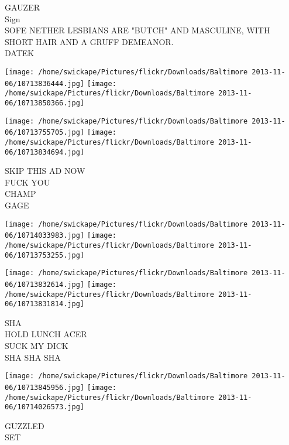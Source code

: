 \documentclass[10pt,letterpaper]{article}
\begin{document}
GAUZER\\
Sign\\
SOFE NETHER LESBIANS ARE "BUTCH" AND MASCULINE, WITH SHORT HAIR AND A GRUFF DEMEANOR.\\
DATEK\\
\pagebreak

\texttt{[image: /home/swickape/Pictures/flickr/Downloads/Baltimore 2013-11-06/10713836444.jpg]}
\texttt{[image: /home/swickape/Pictures/flickr/Downloads/Baltimore 2013-11-06/10713850366.jpg]}

\texttt{[image: /home/swickape/Pictures/flickr/Downloads/Baltimore 2013-11-06/10713755705.jpg]}
\texttt{[image: /home/swickape/Pictures/flickr/Downloads/Baltimore 2013-11-06/10713834694.jpg]}

SKIP THIS AD NOW\\
FUCK YOU\\
CHAMP\\
GAGE\\
\pagebreak

\texttt{[image: /home/swickape/Pictures/flickr/Downloads/Baltimore 2013-11-06/10714033983.jpg]}
\texttt{[image: /home/swickape/Pictures/flickr/Downloads/Baltimore 2013-11-06/10713753255.jpg]}

\texttt{[image: /home/swickape/Pictures/flickr/Downloads/Baltimore 2013-11-06/10713832614.jpg]}
\texttt{[image: /home/swickape/Pictures/flickr/Downloads/Baltimore 2013-11-06/10713831814.jpg]}

SHA\\
HOLD LUNCH ACER\\
SUCK MY DICK\\
SHA SHA SHA\\
\pagebreak

\texttt{[image: /home/swickape/Pictures/flickr/Downloads/Baltimore 2013-11-06/10713845956.jpg]}
\texttt{[image: /home/swickape/Pictures/flickr/Downloads/Baltimore 2013-11-06/10714026573.jpg]}

GUZZLED\\
SET\\
\pagebreak
\end{document}
